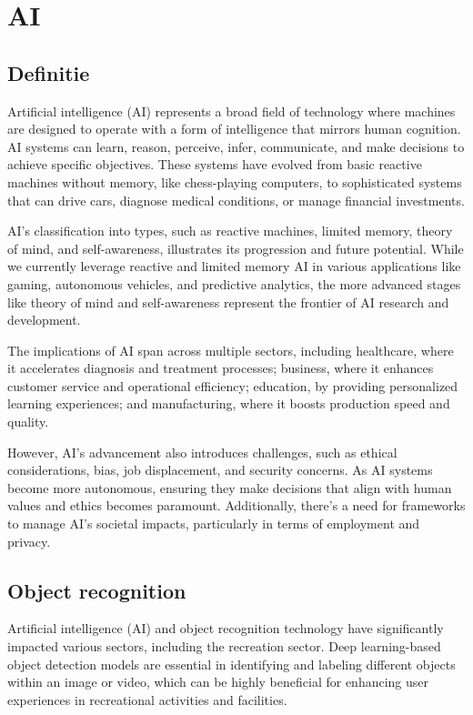 \section{AI}
\subsection{Definitie}

Artificial intelligence (AI) represents a broad field of technology where machines are designed to operate with a form of intelligence that mirrors human cognition. AI systems can learn, reason, perceive, infer, communicate, and make decisions to achieve specific objectives. These systems have evolved from basic reactive machines without memory, like chess-playing computers, to sophisticated systems that can drive cars, diagnose medical conditions, or manage financial investments.

AI's classification into types, such as reactive machines, limited memory, theory of mind, and self-awareness, illustrates its progression and future potential. While we currently leverage reactive and limited memory AI in various applications like gaming, autonomous vehicles, and predictive analytics, the more advanced stages like theory of mind and self-awareness represent the frontier of AI research and development.

The implications of AI span across multiple sectors, including healthcare, where it accelerates diagnosis and treatment processes; business, where it enhances customer service and operational efficiency; education, by providing personalized learning experiences; and manufacturing, where it boosts production speed and quality.

However, AI's advancement also introduces challenges, such as ethical considerations, bias, job displacement, and security concerns. As AI systems become more autonomous, ensuring they make decisions that align with human values and ethics becomes paramount. Additionally, there's a need for frameworks to manage AI's societal impacts, particularly in terms of employment and privacy.

\subsection{Object recognition}
Artificial intelligence (AI) and object recognition technology have significantly impacted various sectors, including the recreation sector. Deep learning-based object detection models are essential in identifying and labeling different objects within an image or video, which can be highly beneficial for enhancing user experiences in recreational activities and facilities.

